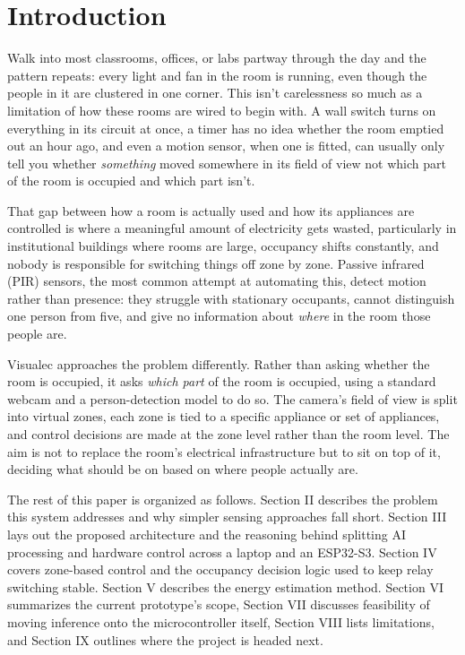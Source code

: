 \documentclass[conference]{IEEEtran}
\begin{document}
\section{Introduction}
Walk into most classrooms, offices, or labs partway through the day and the pattern repeats: every light and fan in the room is running, even though the people in it are clustered in one corner. This isn't carelessness so much as a limitation of how these rooms are wired to begin with. A wall switch turns on everything in its circuit at once, a timer has no idea whether the room emptied out an hour ago, and even a motion sensor, when one is fitted, can usually only tell you whether \textit{something} moved somewhere in its field of view not which part of the room is occupied and which part isn't.

That gap between how a room is actually used and how its appliances are controlled is where a meaningful amount of electricity gets wasted, particularly in institutional buildings where rooms are large, occupancy shifts constantly, and nobody is responsible for switching things off zone by zone. Passive infrared (PIR) sensors, the most common attempt at automating this, detect motion rather than presence: they struggle with stationary occupants, cannot distinguish one person from five, and give no information about \textit{where} in the room those people are.

Visualec approaches the problem differently. Rather than asking whether the room is occupied, it asks \textit{which part} of the room is occupied, using a standard webcam and a person-detection model to do so. The camera's field of view is split into virtual zones, each zone is tied to a specific appliance or set of appliances, and control decisions are made at the zone level rather than the room level. The aim is not to replace the room's electrical infrastructure but to sit on top of it, deciding what should be on based on where people actually are.

The rest of this paper is organized as follows. Section II describes the problem this system addresses and why simpler sensing approaches fall short. Section III lays out the proposed architecture and the reasoning behind splitting AI processing and hardware control across a laptop and an ESP32-S3. Section IV covers zone-based control and the occupancy decision logic used to keep relay switching stable. Section V describes the energy estimation method. Section VI summarizes the current prototype's scope, Section VII discusses feasibility of moving inference onto the microcontroller itself, Section VIII lists limitations, and Section IX outlines where the project is headed next.
\end{document}
